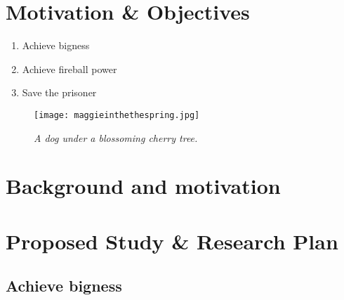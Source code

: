 \section{Motivation \& Objectives}

\lipsum[3]

\begin{enumerate}[label=\textbf{RO~\arabic*.},leftmargin=2cm]

\vspace{-8pt}
\item Achieve bigness

\vspace{-10pt}
\item Achieve fireball power

\vspace{-10pt}
\item Save the prisoner

\end{enumerate}

\lipsum[1]

\setlength{\intextsep}{5pt}  %
\begin{wrapfigure}{R}{0.5\textwidth}
	\texttt{[image: maggieinthethespring.jpg]}
	\caption{\textit{A dog under a blossoming cherry tree.}}
\end{wrapfigure}






\section{Background and motivation}

\lipsum




\section{Proposed Study \& Research Plan}

\lipsum[1]



\renewcommand{\thesubsection}{\arabic{section}.RO-\arabic{subsection}}

\subsection{Achieve bigness}
\label{sec:RO1}
\vspace{-6pt}

